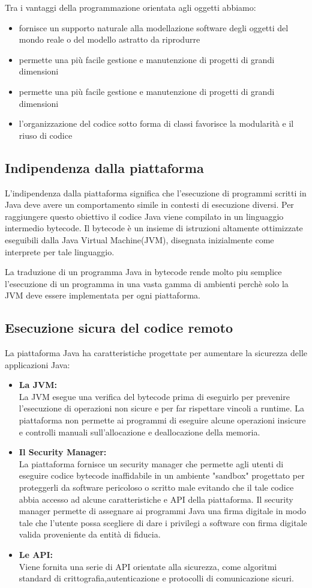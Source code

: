 Tra i vantaggi della programmazione orientata agli oggetti abbiamo:
\begin{itemize}
\item fornisce un supporto naturale alla modellazione software degli oggetti del mondo reale o del modello astratto da riprodurre
\item permette una pi\`u facile gestione e manutenzione di progetti di grandi dimensioni
\item permette una pi\`u facile gestione e manutenzione di progetti di grandi dimensioni
\item l'organizzazione del codice sotto forma di classi favorisce la modularit\`a e il riuso di codice
\end{itemize}
\subsection*{Indipendenza dalla piattaforma}
L'indipendenza dalla piattaforma significa che l’esecuzione di programmi scritti  in  Java  deve  avere  un  comportamento  simile 
in contesti di esecuzione diversi. Per raggiungere questo obiettivo il codice Java viene compilato in un linguaggio intermedio bytecode. Il bytecode \`e un insieme di istruzioni altamente ottimizzate eseguibili dalla Java Virtual Machine(JVM), disegnata inizialmente come interprete per tale linguaggio.

La traduzione di un programma Java in bytecode rende molto piu semplice l'esecuzione di un programma in una vasta gamma di ambienti perch\`e solo la JVM deve essere implementata per ogni piattaforma.
\subsection*{Esecuzione sicura del codice remoto}
La piattaforma Java ha caratteristiche progettate per aumentare la sicurezza delle applicazioni Java:
\begin{itemize}
\item \textbf{La JVM:}\\
La JVM esegue una verifica del bytecode prima di eseguirlo per prevenire l'esecuzione di operazioni non sicure e per far rispettare vincoli a runtime. La piattaforma non permette ai programmi di eseguire alcune operazioni insicure e controlli manuali sull'allocazione e deallocazione della memoria.
\item \textbf{Il Security Manager:}\\
La piattaforma fornisce un security manager che permette agli utenti di eseguire codice bytecode inaffidabile in un ambiente "sandbox" progettato per proteggerli da software pericoloso o scritto male evitando che il tale codice abbia accesso ad alcune caratteristiche e API della piattaforma.
Il security manager permette di assegnare ai programmi Java una firma digitale in modo tale che l'utente possa scegliere di dare i privilegi a software con firma digitale valida proveniente da entità di fiducia.
\item \textbf{Le API:}\\
Viene fornita una serie di API orientate alla sicurezza, come algoritmi standard di crittografia,autenticazione e protocolli di comunicazione sicuri.
\end{itemize}

